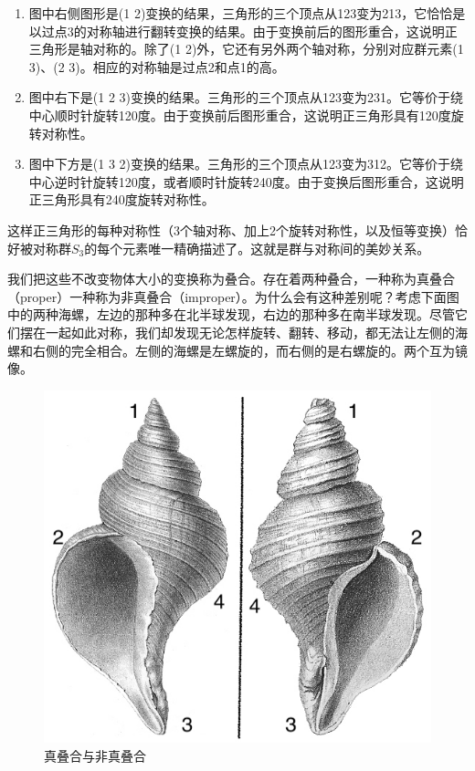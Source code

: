 \documentclass[b5paper]{ctexart}
\begin{document}
\begin{enumerate}
\item 图中右侧图形是(1 2)变换的结果，三角形的三个顶点从123变为213，它恰恰是以过点3的对称轴进行翻转变换的结果。由于变换前后的图形重合，这说明正三角形是轴对称的。除了(1 2)外，它还有另外两个轴对称，分别对应群元素(1 3)、(2 3)。相应的对称轴是过点2和点1的高。

\item 图中右下是(1 2 3)变换的结果。三角形的三个顶点从123变为231。它等价于绕中心顺时针旋转120度。由于变换前后图形重合，这说明正三角形具有120度旋转对称性。

\item 图中下方是(1 3 2)变换的结果。三角形的三个顶点从123变为312。它等价于绕中心逆时针旋转120度，或者顺时针旋转240度。由于变换后图形重合，这说明正三角形具有240度旋转对称性。
\end{enumerate}

这样正三角形的每种对称性（3个轴对称、加上2个旋转对称性，以及恒等变换）恰好被对称群$S_3$的每个元素唯一精确描述了。这就是群与对称间的美妙关系。

我们把这些不改变物体大小的变换称为叠合。存在着两种叠合，一种称为真叠合（proper）一种称为非真叠合（improper）。为什么会有这种差别呢？考虑下面图中的两种海螺，左边的那种多在北半球发现，右边的那种多在南半球发现。尽管它们摆在一起如此对称，我们却发现无论怎样旋转、翻转、移动，都无法让左侧的海螺和右侧的完全相合。左侧的海螺是左螺旋的，而右侧的是右螺旋的。两个互为镜像。

\begin{figure}[htbp]
 \centering
 \includegraphics[scale=0.3]{img/chirality.jpg}
 \caption{真叠合与非真叠合}
 \label{fig:chirality}
\end{figure}
\end{document}
